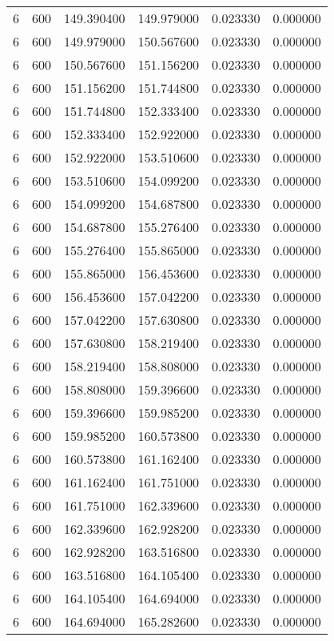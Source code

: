 \begin{longtable}{rrrrrr}
6 & 600 & 149.390400 & 149.979000 & 0.023330 & 0.000000 \\
6 & 600 & 149.979000 & 150.567600 & 0.023330 & 0.000000 \\
6 & 600 & 150.567600 & 151.156200 & 0.023330 & 0.000000 \\
6 & 600 & 151.156200 & 151.744800 & 0.023330 & 0.000000 \\
6 & 600 & 151.744800 & 152.333400 & 0.023330 & 0.000000 \\
6 & 600 & 152.333400 & 152.922000 & 0.023330 & 0.000000 \\
6 & 600 & 152.922000 & 153.510600 & 0.023330 & 0.000000 \\
6 & 600 & 153.510600 & 154.099200 & 0.023330 & 0.000000 \\
6 & 600 & 154.099200 & 154.687800 & 0.023330 & 0.000000 \\
6 & 600 & 154.687800 & 155.276400 & 0.023330 & 0.000000 \\
6 & 600 & 155.276400 & 155.865000 & 0.023330 & 0.000000 \\
6 & 600 & 155.865000 & 156.453600 & 0.023330 & 0.000000 \\
6 & 600 & 156.453600 & 157.042200 & 0.023330 & 0.000000 \\
6 & 600 & 157.042200 & 157.630800 & 0.023330 & 0.000000 \\
6 & 600 & 157.630800 & 158.219400 & 0.023330 & 0.000000 \\
6 & 600 & 158.219400 & 158.808000 & 0.023330 & 0.000000 \\
6 & 600 & 158.808000 & 159.396600 & 0.023330 & 0.000000 \\
6 & 600 & 159.396600 & 159.985200 & 0.023330 & 0.000000 \\
6 & 600 & 159.985200 & 160.573800 & 0.023330 & 0.000000 \\
6 & 600 & 160.573800 & 161.162400 & 0.023330 & 0.000000 \\
6 & 600 & 161.162400 & 161.751000 & 0.023330 & 0.000000 \\
6 & 600 & 161.751000 & 162.339600 & 0.023330 & 0.000000 \\
6 & 600 & 162.339600 & 162.928200 & 0.023330 & 0.000000 \\
6 & 600 & 162.928200 & 163.516800 & 0.023330 & 0.000000 \\
6 & 600 & 163.516800 & 164.105400 & 0.023330 & 0.000000 \\
6 & 600 & 164.105400 & 164.694000 & 0.023330 & 0.000000 \\
6 & 600 & 164.694000 & 165.282600 & 0.023330 & 0.000000 \\

\end{longtable}
